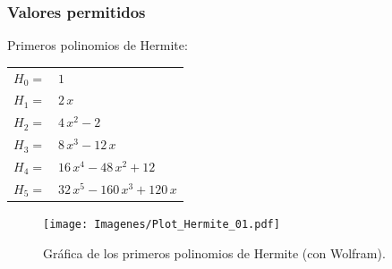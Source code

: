 \documentclass[12pt]{beamer}
\begin{document}
\begin{frame}
\frametitle{Valores permitidos}
Primeros polinomios de Hermite:
\pause
\begin{table}[H]
\renewcommand{\arraystretch}{0.9}
\centering
\begin{tabular}{l l}
$H_{0} =$ & $1$ \\
$H_{1} =$ & $2 \, x$ \\
$H_{2} =$ & $4 \, x^{2} - 2 $ \\
$H_{3} =$ & $8 \, x^{3} - 12 \, x$ \\
$H_{4} =$ & $16 \, x^{4} - 48 \, x^{2} + 12 $ \\
$H_{5} =$ & $32 \, x^{5} - 160 \, x^{3} + 120 \, x $
\end{tabular}
\end{table}
\end{frame}
\begin{frame}[plain]
\begin{figure}[H]
    \centering
    \texttt{[image: Imagenes/Plot\_Hermite\_01.pdf]}
    \caption{Gráfica de los primeros polinomios de Hermite (con Wolfram).}
    \label{figura_004}
\end{figure}
\end{frame}
\end{document}
